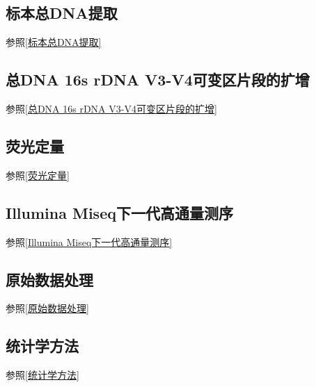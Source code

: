   \subsection{标本总DNA提取}
  参照\ref{标本总DNA提取}
  \subsection{总DNA 16s rDNA V3-V4可变区片段的扩增}
  参照\ref{总DNA 16s rDNA V3-V4可变区片段的扩增}
  \subsection{荧光定量}
  参照\ref{荧光定量}
  \subsection{Illumina Miseq下一代高通量测序}
  参照\ref{Illumina Miseq下一代高通量测序}
  \subsection{原始数据处理}
  参照\ref{原始数据处理}
  \subsection{统计学方法}
  参照\ref{统计学方法}
